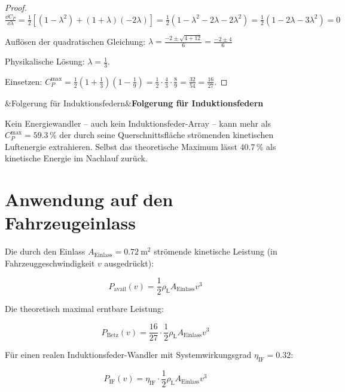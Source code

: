 ﻿\documentclass[12pt, a4paper]{report}
\newenvironment{ergebnis}[1][]{%
  \begin{ergebnisframe}\sloppy%
  \ifx&#1&\else\textbf{#1}\par\smallskip\fi}{\end{ergebnisframe}}
\theoremstyle{definition}
\theoremstyle{remark}
\newcommand{\rhoL}{\rho_{\text{L}}}
\newcommand{\Aeinlass}{A_{\text{Einlass}}}
\begin{document}
\begin{proof}
  $\frac{\dd C_P}{\dd\lambda} = \frac{1}{2}\left[(1-\lambda^2) + (1+\lambda)(-2\lambda)\right]
  = \frac{1}{2}(1-\lambda^2-2\lambda-2\lambda^2) = \frac{1}{2}(1-2\lambda-3\lambda^2) = 0$

  Auflösen der quadratischen Gleichung:
  $\lambda = \frac{-2 \pm \sqrt{4 + 12}}{6} = \frac{-2 \pm 4}{6}$

  Physikalische Lösung: $\lambda = \frac{1}{3}$.

  Einsetzen: $C_P^{\max} = \frac{1}{2}\left(1+\frac{1}{3}\right)\left(1-\frac{1}{9}\right)
  = \frac{1}{2} \cdot \frac{4}{3} \cdot \frac{8}{9} = \frac{32}{54} = \frac{16}{27}$.
\end{proof}

\begin{ergebnis}[Folgerung für Induktionsfedern]
  Kein Energiewandler -- auch kein Induktionsfeder-Array -- kann mehr als
  $C_P^{\max} = 59.3\,\%$ der durch seine Querschnittsfläche strömenden
  kinetischen Luftenergie extrahieren. Selbst das theoretische Maximum
  lässt 40.7\,\% als kinetische Energie im Nachlauf zurück.
\end{ergebnis}

\section{Anwendung auf den Fahrzeugeinlass}

Die durch den Einlass $\Aeinlass = \SI{0.72}{\metre\squared}$ strömende
kinetische Leistung (in Fahrzeuggeschwindigkeit $v$ ausgedrückt):

\begin{equation}
  P_{\text{avail}}(v) = \frac{1}{2}\rhoL \Aeinlass v^3
  \label{eq:p_avail}
\end{equation}

Die theoretisch maximal erntbare Leistung:

\begin{equation}
  P_{\text{Betz}}(v) = \frac{16}{27} \cdot \frac{1}{2}\rhoL \Aeinlass v^3
  \label{eq:p_betz_einlass}
\end{equation}

Für einen realen Induktionsfeder-Wandler mit Systemwirkungsgrad $\eta_{\text{IF}} = 0.32$:

\begin{equation}
  P_{\text{IF}}(v) = \eta_{\text{IF}} \cdot \frac{1}{2}\rhoL \Aeinlass v^3
  \label{eq:p_if}
\end{equation}
\end{document}
